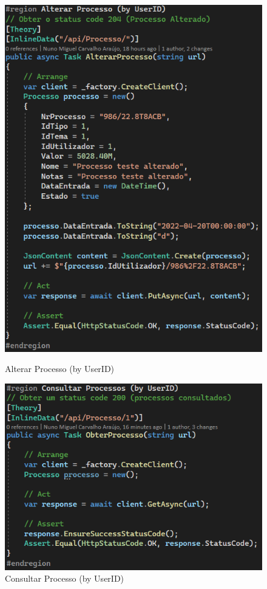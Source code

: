 \begin{figure}[!htbp]
\begin{minipage}[b]{0.4\textwidth}
    \includegraphics[width=\textwidth]{Figuras/TestesUnitarios/Processo/Alterar Processo (by User ID).png}
    \caption{Alterar Processo (by UserID)}
    \label{d.unitario}
  \end{minipage}
  \centering
  \begin{minipage}[b]{0.4\textwidth}
    \includegraphics[width=\textwidth]{Figuras/TestesUnitarios/Processo/Consultar Processo (by User ID).png}
    \caption{Consultar Processo (by UserID)}
    \label{d.unitario}
  \end{minipage}
\end{figure}

